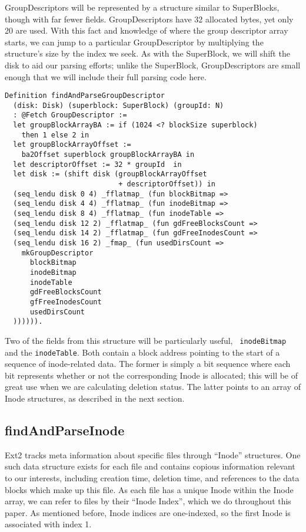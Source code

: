\documentclass[nocopyrightspace,preprint]{sigplanconf}
\begin{document}
GroupDescriptors will be represented by a structure similar to SuperBlocks,
though with far fewer fields. GroupDescriptors have 32 allocated bytes, yet
only 20 are used. With this fact and knowledge of where the group descriptor
array starts, we can jump to a particular GroupDescriptor by multiplying the
structure's size by the index we seek. As with the SuperBlock, we will shift
the disk to aid our parsing efforts; unlike the SuperBlock, GroupDescriptors
are small enough that we will include their full parsing code here.

\begin{lstlisting}
Definition findAndParseGroupDescriptor 
  (disk: Disk) (superblock: SuperBlock) (groupId: N)
  : @Fetch GroupDescriptor :=
  let groupBlockArrayBA := if (1024 <? blockSize superblock)
    then 1 else 2 in
  let groupBlockArrayOffset := 
    ba2Offset superblock groupBlockArrayBA in
  let descriptorOffset := 32 * groupId  in
  let disk := (shift disk (groupBlockArrayOffset 
                           + descriptorOffset)) in
  (seq_lendu disk 0 4) _fflatmap_ (fun blockBitmap =>
  (seq_lendu disk 4 4) _fflatmap_ (fun inodeBitmap =>
  (seq_lendu disk 8 4) _fflatmap_ (fun inodeTable =>
  (seq_lendu disk 12 2) _fflatmap_ (fun gdFreeBlocksCount =>
  (seq_lendu disk 14 2) _fflatmap_ (fun gdFreeInodesCount =>
  (seq_lendu disk 16 2) _fmap_ (fun usedDirsCount =>
    mkGroupDescriptor
      blockBitmap
      inodeBitmap
      inodeTable
      gdFreeBlocksCount
      gfFreeInodesCount
      usedDirsCount
  )))))).
\end{lstlisting}

Two of the fields from this structure will be particularly useful, {\tt
inodeBitmap} and the {\tt inodeTable}. Both contain a block address pointing
to the start of a sequence of inode-related data. The former is simply a bit
sequence where each bit represents whether or not the corresponding Inode is
allocated; this will be of great use when we are calculating deletion status.
The latter points to an array of Inode structures, as described in the next
section.

\subsection{findAndParseInode}

Ext2 tracks meta information about specific files through ``Inode''
structures. One such data structure exists for each file and contains copious
information relevant to our interests, including creation time, deletion time,
and references to the data blocks which make up this file. As each file has a
unique Inode within the Inode array, we can refer to files by their ``Inode
Index'', which we do throughout this paper. As mentioned before, Inode indices
are one-indexed, so the first Inode is associated with index 1.
\end{document}
